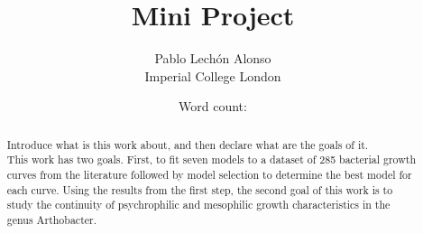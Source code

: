 \documentclass[titlepage,11pt]{article}
\newcommand{\wordcount}{} %
\begin{document}
	\title{Mini Project}
	\author{Pablo Lechón Alonso \\ 
				Imperial College London}
	\date{Word count: \wordcount}%
	\maketitle

	\begin{abstract}
		Introduce what is this work about, and then declare what are the goals of it.\\
		This work has two goals. First, to fit seven models to a dataset of 285 bacterial growth curves from the literature \cite{Bae2014, Bernhardt2018, Galarz2016, Gill1991, Phillips1987, ROTH1962, DaSilva2018, Sivonen1990, Stannard1985, Zwietering1994} followed by model selection to determine the best model for each curve. Using the results from the first step, the second goal of this work is to study the continuity of psychrophilic and mesophilic growth characteristics in the genus Arthobacter.\\
	\end{abstract}
	
\end{document}
